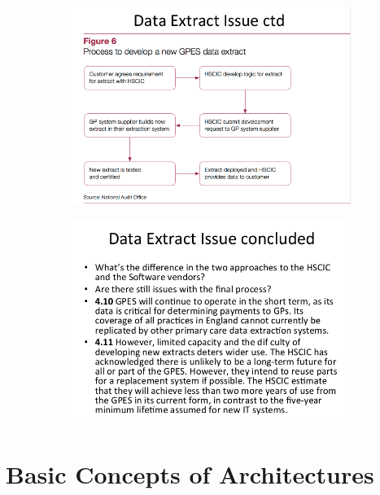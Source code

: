 \documentclass[a4paper]{article}
\begin{document}
\begin{figure}[H]
\centering
\begin{subfigure}{1\textwidth}
  \includegraphics[width=1\linewidth]
  {images/1-issues.png}
\end{subfigure}
\end{figure}

\begin{figure}[H]
\centering
\begin{subfigure}{1\textwidth}
  \includegraphics[width=1\linewidth]
  {images/1-issues-concluded.png}
\end{subfigure}
\end{figure}
\newpage

\section{Basic Concepts of Architectures}
\end{document}
